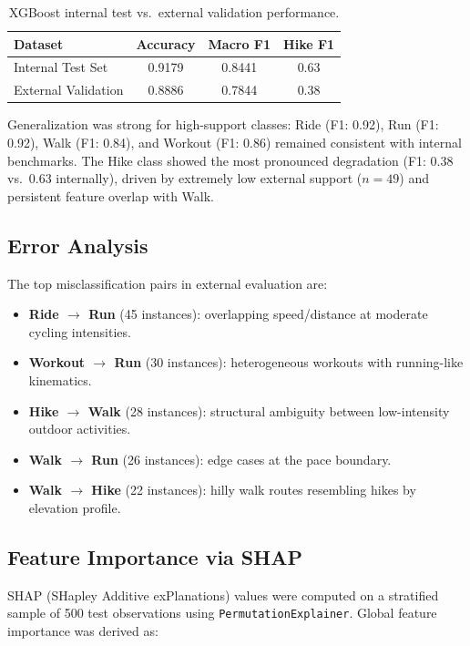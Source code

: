 \documentclass[11pt, onecolumn]{article}
\begin{document}
\begin{table}[H]
\centering
\caption{XGBoost internal test vs.\ external validation performance.}
\label{tab:external}
\begin{tabular}{lccc}
\toprule
\textbf{Dataset} & \textbf{Accuracy} & \textbf{Macro F1} & \textbf{Hike F1} \\
\midrule
Internal Test Set    & 0.9179 & 0.8441 & 0.63 \\
External Validation  & 0.8886 & 0.7844 & 0.38 \\
\bottomrule
\end{tabular}
\end{table}

Generalization was strong for high-support classes: Ride (F1: 0.92), Run (F1: 0.92), Walk (F1: 0.84), and Workout (F1: 0.86) remained consistent with internal benchmarks. The Hike class showed the most pronounced degradation (F1: 0.38 vs.\ 0.63 internally), driven by extremely low external support ($n=49$) and persistent feature overlap with Walk.

\subsection{Error Analysis}

The top misclassification pairs in external evaluation are:

\begin{itemize}
    \item \textbf{Ride $\rightarrow$ Run} (45 instances): overlapping speed/distance at moderate cycling intensities.
    \item \textbf{Workout $\rightarrow$ Run} (30 instances): heterogeneous workouts with running-like kinematics.
    \item \textbf{Hike $\rightarrow$ Walk} (28 instances): structural ambiguity between low-intensity outdoor activities.
    \item \textbf{Walk $\rightarrow$ Run} (26 instances): edge cases at the pace boundary.
    \item \textbf{Walk $\rightarrow$ Hike} (22 instances): hilly walk routes resembling hikes by elevation profile.
\end{itemize}

\subsection{Feature Importance via SHAP}

SHAP (SHapley Additive exPlanations) values were computed on a stratified sample of 500 test observations using \texttt{PermutationExplainer}. Global feature importance was derived as:
\end{document}
